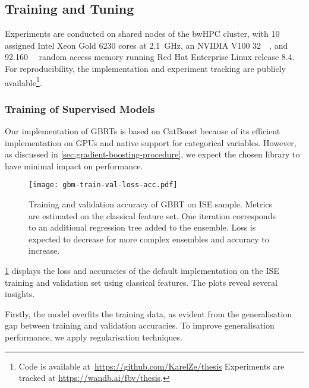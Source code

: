 \subsection{Training and Tuning}\label{sec:training-and-tuning}

Experiments are conducted on shared nodes of the bwHPC cluster, with 10 assigned Intel Xeon Gold 6230 cores at \SI{2.1}{\GHz}, an NVIDIA V100 \SI{32}{\giga\byte}, and \SI{92.160}{\giga\byte} random access memory running Red Hat Enterprise Linux release 8.4. For reproducibility, the implementation and experiment tracking are publicly available\footnote{Code is available at~\url{https://github.com/KarelZe/thesis} Experiments are tracked at \url{https://wandb.ai/fbv/thesis}.}.

\subsubsection{Training of Supervised
    Models}\label{sec:training-of-supervised-models}

Our implementation of \glspl{GBRT} is based on CatBoost \autocite[][5--6]{prokhorenkovaCatBoostUnbiasedBoosting2018} because of its efficient implementation on \glspl{GPU} and native support for categorical variables. However, as discussed in \cref{sec:gradient-boosting-procedure}, we expect the chosen library to have minimal impact on performance.

\begin{figure}[ht]
    \centering
    \texttt{[image: gbm-train-val-loss-acc.pdf]}
    \caption[Training and Validation Accuracy of  on  Sample]{Training and validation accuracy of \gls{GBRT} on \gls{ISE} sample. Metrics are estimated on the classical feature set. One iteration corresponds to an additional regression tree added to the ensemble. Loss is expected to decrease for more complex ensembles and accuracy to increase.}
    \label{fig:gbm-train-val-loss-acc}
\end{figure}

\cref{fig:gbm-train-val-loss-acc} displays the loss and accuracies of the default implementation on the \gls{ISE} training and validation set using classical features. The plots reveal several insights.

Firstly, the model overfits the training data, as evident from the generalisation gap between training and validation accuracies. To improve generalisation performance, we apply regularisation techniques.

